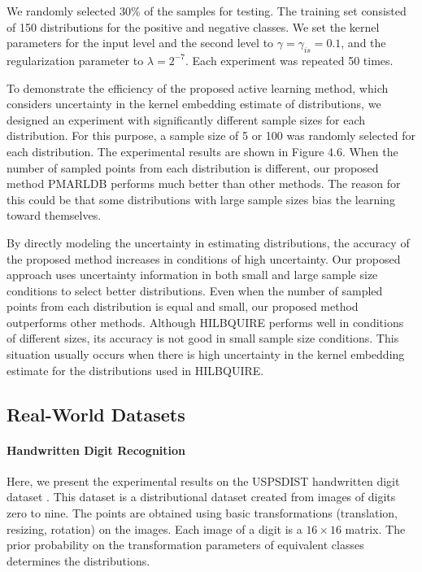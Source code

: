 \documentclass[12pt]{article}
\begin{document}
	We randomly selected 30\% of the samples for testing. The training set consisted of 150 distributions for the positive and negative classes. We set the kernel parameters for the input level and the second level to $\gamma = \gamma_{is} = 0.1$, and the regularization parameter to $\lambda = 2^{-7}$. Each experiment was repeated 50 times.
	
	To demonstrate the efficiency of the proposed active learning method, which considers uncertainty in the kernel embedding estimate of distributions, we designed an experiment with significantly different sample sizes for each distribution. For this purpose, a sample size of 5 or 100 was randomly selected for each distribution. The experimental results are shown in Figure 4.6. When the number of sampled points from each distribution is different, our proposed method PMARLDB performs much better than other methods. The reason for this could be that some distributions with large sample sizes bias the learning toward themselves.
	
	By directly modeling the uncertainty in estimating distributions, the accuracy of the proposed method increases in conditions of high uncertainty. Our proposed approach uses uncertainty information in both small and large sample size conditions to select better distributions. Even when the number of sampled points from each distribution is equal and small, our proposed method outperforms other methods. Although HILBQUIRE performs well in conditions of different sizes, its accuracy is not good in small sample size conditions. This situation usually occurs when there is high uncertainty in the kernel embedding estimate for the distributions used in HILBQUIRE.
	
	\subsection{Real-World Datasets}
	
	\paragraph{Handwritten Digit Recognition}
	Here, we present the experimental results on the USPSDIST handwritten digit dataset \cite{sriperumbudur2009kernel}. This dataset is a distributional dataset created from images of digits zero to nine. The points are obtained using basic transformations (translation, resizing, rotation) on the images. Each image of a digit is a $16 \times 16$ matrix. The prior probability on the transformation parameters of equivalent classes determines the distributions.
	
\end{document}
